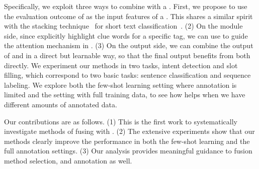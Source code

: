 


Specifically, we exploit three ways to combine \REs with a \NN. First, we propose to use the evaluation outcome of \REs as the input
features of a \NN. This shares a similar spirit with the stacking technique~\cite{wolpert1992stacked} for short text
classification~\cite{wang2017combining}. (2) On the \NN module side, since \REs explicitly highlight clue words for a specific tag, we can
use \RE to guide the attention mechanism in \NN. (3) On the \NN output side, we can combine the output of \RE and \NN in
a direct but learnable way, so that the final output benefits from both directly. %
%
We experiment our methods in two  tasks, intent detection
and slot filling, which correspond to two basic \NLP tasks: sentence classification and sequence labeling.
%
We explore both the few-shot learning setting where annotation is limited and the setting with full training data,
to see how \RE helps when we have different amounts of annotated data.

Our contributions are as follows. (1) This is the first work to systematically investigate methods of fusing \RE with \NN. (2) The
extensive experiments show that our methods clearly improve the \NN performance in both the few-shot learning and the
full annotation settings. (3) Our analysis provides meaningful guidance to fusion method selection, and \RE annotation as well.

